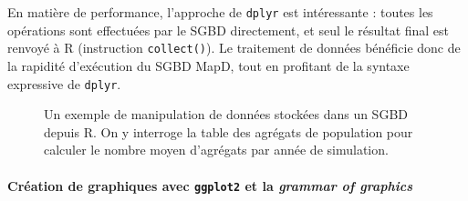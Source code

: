 En matière de performance, l'approche de \texttt{dplyr} est intéressante : toutes les opérations sont effectuées par le SGBD directement, et seul le résultat final est renvoyé à R (instruction \texttt{collect()}).
Le traitement de données bénéficie donc de la rapidité d'exécution du SGBD MapD, tout en profitant de la syntaxe expressive de \texttt{dplyr}.

\begin{figure}[H]
\centering
\hspace{5pt}
\hspace{5pt}
\caption{Un exemple de manipulation de données stockées dans un SGBD depuis R. On y interroge la table des agrégats de population pour calculer le nombre moyen d'agrégats par année de simulation.}
\label{fig:dml-simedb}
\end{figure}

\clearpage
\paragraph*{Création de graphiques avec \texttt{ggplot2} et la \og \textit{grammar of graphics}\fg{}}

